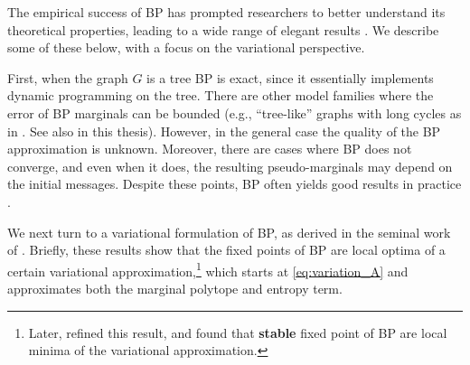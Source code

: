 The empirical success of BP has prompted researchers to better understand its theoretical properties, leading to a wide range of elegant results \cite{tatikonda2002loopy,wainwright2003tree,ihler05b}.
We describe some of these below, with a focus on the variational perspective.

First, when the graph $G$ is a tree BP is exact, since it essentially implements
dynamic programming on the tree. There are other model families  where the error of BP marginals can be bounded (e.g., ``tree-like'' graphs with long cycles as in  \cite{dembo2010ising}. See also  \cite{heinemann2014inferning} in this thesis).
However, in the general case the quality of the BP approximation is unknown. 
Moreover, there are cases where BP does not converge, and even when it does, the resulting pseudo-marginals may depend on the initial messages.
 Despite these points, BP often yields  good results in practice  \cite{willsky2002multiresolution,kschischang2003codes,loeliger2004introduction}.

We next turn to a variational formulation of BP, as derived in the seminal work of  \citet{yedidia2000generalized, yedidia2003understanding}. Briefly, these results
show that the fixed points of BP are local optima of a certain variational approximation,\footnote{Later,  \cite{heskes2002stable} refined this result, and found that \textbf{stable} fixed point of BP are local minima of the variational approximation.} which starts
at \eqref{eq:variation_A} and approximates both the marginal polytope and entropy term.



